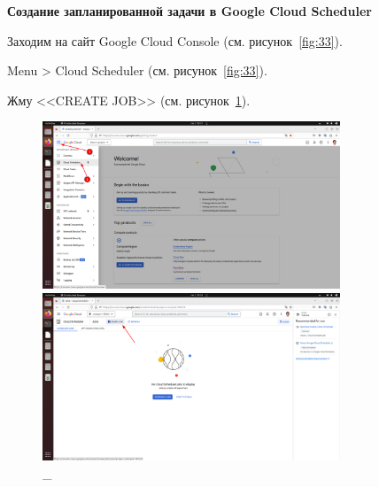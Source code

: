 \documentclass[12pt, a4paper, simple]{eskdtext}
\begin{document}
  \newpage

  \begin{center}
    \textbf{Создание запланированной задачи в Google Cloud Scheduler}
  \end{center}

  Заходим на сайт Google Cloud Console \cite{GoogleCloudConsole} (см. рисунок~\ref{fig:33}).

  Menu > Cloud Scheduler \cite{GoogleCloudScheduler} (см. рисунок~\ref{fig:33}).

  Жму <<CREATE JOB>> (см. рисунок~\ref{fig:34}).

  \begin{figure}[!h]
    \centering
  
    \begin{minipage}{0.49\textwidth}
      \centering
  
      \includegraphics[height=5cm]
      {images/GoogleCloudScheduler/2023-03-02_04-58-10.png}
  
      \caption{\_}
  
      \label{fig:33}
    \end{minipage}
    \begin{minipage}{0.49\textwidth}
      \centering
  
      \includegraphics[height=5cm]
      {images/GoogleCloudScheduler/2023-03-02_04-59-19.png}
  
      \caption{\_}
  
      \label{fig:34}
    \end{minipage}
  \end{figure}
\end{document}
